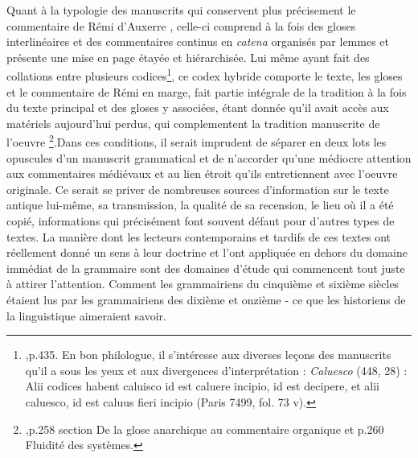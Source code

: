 \documentclass[a4paper, twoside, 12pt]{book}
\begin{document}
Quant à la typologie des manuscrits qui conservent plus précisement le commentaire de Rémi d'Auxerre , celle-ci comprend à la fois des gloses interlinéaires et des commentaires continus en \textit{catena} organisés par lemmes et présente une mise en page étayée et hiérarchisée. Lui même ayant fait des \og{} collations\fg{} entre plusieurs codices\footnote{ \cite{jeudy1974manuscrits},p.435. En bon philologue, il s'intéresse aux diverses leçons  des  manuscrits qu'il a sous les yeux et aux divergences d'interprétation : \textit{Caluesco }(448, 28) : \og{} Alii codices habent caluisco id est caluere incipio, id est decipere, et alii caluesco, id  est caluus fieri incipio \fg{} (Paris 7499, fol. 73 v).}, ce codex hybride comporte le texte, les gloses et le commentaire de Rémi en marge, fait partie intégrale de la tradition à la fois du texte principal et des gloses y associées, étant donnée qu'il avait accès aux matériels aujourd'hui perdus, qui complementent la tradition manuscrite de l'oeuvre \footnote{\cite{holtz1978typologie},p.258 section \og{} De la glose anarchique au commentaire organique\fg{} et p.260 \og{} Fluidité des systèmes\fg{}.}.Dans ces conditions, il serait imprudent de séparer en deux lots les opuscules d'un manuscrit grammatical et de n'accorder qu'une médiocre attention aux commentaires médiévaux et au lien étroit qu'ils entretiennent avec l'oeuvre originale. Ce serait se priver de nombreuses sources d'information sur le texte antique lui-même, sa transmission, la qualité de sa recension, le lieu où il a été copié, informations qui précisément font souvent défaut pour d'autres types de textes. La manière dont les lecteurs contemporains et tardifs de ces textes ont réellement donné un sens à leur doctrine et l'ont appliquée en dehors du domaine immédiat de la grammaire sont des domaines d'étude qui commencent tout juste à attirer l'attention. Comment les grammairiens du cinquième et sixième siècles étaient lus par les grammairiens des dixième et onzième - ce que les historiens de la linguistique aimeraient savoir.\\
\end{document}
